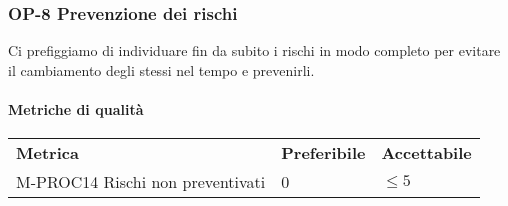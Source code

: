 		\subsubsection{OP-8 Prevenzione dei rischi} 
			Ci prefiggiamo di individuare fin da subito i rischi in modo completo per evitare il cambiamento degli stessi nel tempo e prevenirli.
			\paragraph{Metriche di qualità} \mbox{} 
			\begin{longtable} {
					>{}p{80mm} 
					>{}p{25mm}
					>{}p{25mm}
				}
				\rowcolor{gray!50}
				\textbf{Metrica} & \textbf{Preferibile} & \textbf{Accettabile} \TBstrut \TBstrut \\
				M-PROC14 Rischi non preventivati & 0 & $ \le 5$ \TBstrut \\ [2mm]
			\end{longtable}
			

